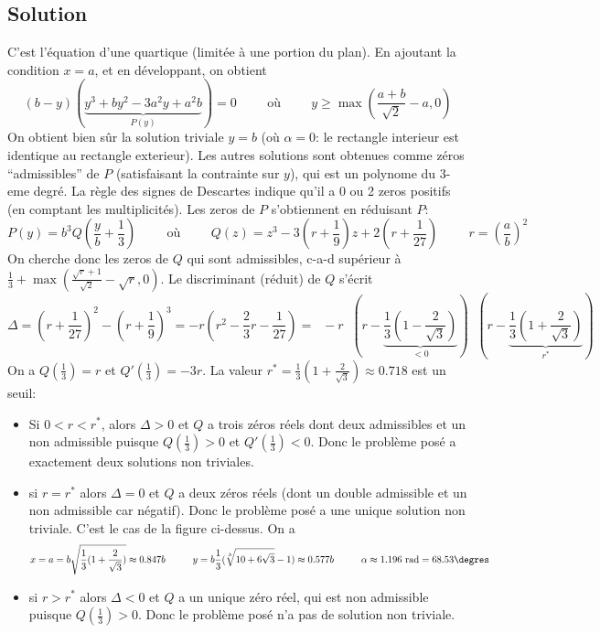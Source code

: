 \documentclass{article}
\newenvironment{solution}{\subsection{Solution}}{\pagebreak}
\begin{document}
\begin{solution}
\[\]
C'est l'équation d'une quartique (limitée à une portion du plan). En ajoutant la condition $x=a$, et en développant, on obtient
\[
(b-y)(\underbrace{y^3+by^2-3a^2y+a^2b}_{P(y)})=0
\hspace{1cm}\textrm{où}\hspace{1cm}
y\geq\max(\frac{a+b}{\sqrt{2}}-a,0)
\]
On obtient bien sûr la solution triviale $y=b$ (où $\alpha=0$: le rectangle interieur est identique au rectangle exterieur). Les autres solutions sont obtenues comme zéros ``admissibles'' de $P$ (satisfaisant la contrainte sur $y$), qui est un polynome du 3-eme degré. La règle des signes de Descartes indique qu'il a 0 ou 2 zeros positifs (en comptant les multiplicités). Les zeros de $P$ s'obtiennent en réduisant $P$:
\[
P(y) = b^3Q(\frac{y}{b}+\frac{1}{3})
\hspace{1cm}\textrm{où}\hspace{1cm}
Q(z)=z^3-3(r+\frac{1}{9})z+2(r+\frac{1}{27})
\hspace{1cm}
r=\left(\frac{a}{b}\right)^2
\]
On cherche donc les zeros de $Q$ qui sont admissibles, c-a-d supérieur à $\frac{1}{3}+\max(\frac{\sqrt{r}+1}{\sqrt{2}}-\sqrt{r},0)$. Le discriminant (réduit) de $Q$ s'écrit
\[
\Delta = (r+\frac{1}{27})^2-(r+\frac{1}{9})^3=-r(r^2-\frac{2}{3}r-\frac{1}{27}) =
\;\;-r\;\;(r-\underbrace{\frac{1}{3}(1-\frac{2}{\sqrt{3}})}_{<0})\;\;(r-\underbrace{\frac{1}{3}(1+\frac{2}{\sqrt{3}})}_{r^*})
\]
On a $Q(\frac{1}{3})=r$ et $Q'(\frac{1}{3})=-3r$. La valeur $r^*=\frac{1}{3}(1+\frac{2}{\sqrt{3}})\approx0.718$ est un seuil:
\begin{itemize}
\item
Si $0<r<r^*$, alors $\Delta>0$ et $Q$ a trois zéros réels dont deux admissibles et un non admissible puisque $Q(\frac{1}{3})>0$ et $Q'(\frac{1}{3})<0$. Donc le problème posé a exactement deux solutions non triviales.
\item
si $r=r^*$ alors $\Delta=0$ et $Q$ a deux zéros réels (dont un double admissible et un non admissible car négatif). Donc le problème posé a une unique solution non triviale. C'est le cas de la figure ci-dessus. On a
\[
x=a=b\sqrt{\frac{1}{3}(1+\frac{2}{\sqrt{3}})}\approx0.847b
\hspace{1cm}
y=b\frac{1}{3}(\sqrt[3]{10+6\sqrt{3}}-1)\approx0.577b
\hspace{1cm}
\alpha\approx1.196\textrm{ rad}=68.53\degres
\]
\item
si $r>r^*$ alors $\Delta<0$ et $Q$ a un unique zéro réel, qui est non admissible puisque $Q(\frac{1}{3})>0$. Donc le problème posé n'a pas de solution non triviale.
\end{itemize}
\end{solution}
\end{document}

